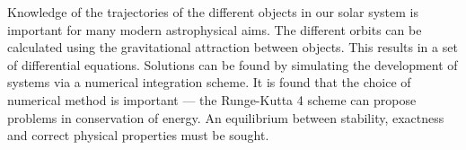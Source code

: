 Knowledge of the trajectories of the different objects in our solar
system is important for many modern astrophysical aims. The
different orbits can be calculated using the gravitational
attraction between objects. This results in a set of differential
equations. Solutions can be found by simulating the development of
systems via a numerical integration scheme. It is found that the
choice of numerical method is important --- the Runge-Kutta 4
scheme can propose problems in conservation of energy.  An
equilibrium between stability, exactness and correct physical
properties must be sought.
